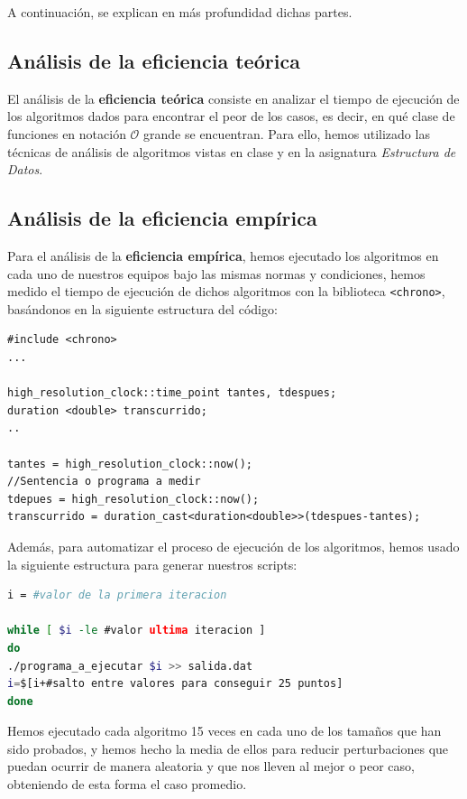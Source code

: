 \documentclass[10pt,a4paper]{article}
\begin{document}
A continuación, se explican en más profundidad dichas partes.

\subsection{Análisis de la eficiencia teórica}

El análisis de la \textbf{eficiencia teórica} consiste en analizar el tiempo de ejecución de los algoritmos dados para encontrar el peor de los casos, es decir, en qué clase de funciones en notación \(\mathcal{O}\) grande se encuentran. Para ello, hemos utilizado las técnicas de análisis de algoritmos vistas en clase y en la asignatura \textit{Estructura de Datos}.

\subsection{Análisis de la eficiencia empírica}

Para el análisis de la \textbf{eficiencia empírica}, hemos ejecutado los algoritmos en cada uno de nuestros equipos bajo las mismas normas y condiciones, hemos medido el tiempo de ejecución de dichos algoritmos con la biblioteca \texttt{<chrono>}, basándonos en la siguiente estructura del código:

\begin{lstlisting}
#include <chrono>
...

high_resolution_clock::time_point tantes, tdespues;
duration <double> transcurrido;
..

tantes = high_resolution_clock::now();
//Sentencia o programa a medir
tdepues = high_resolution_clock::now();
transcurrido = duration_cast<duration<double>>(tdespues-tantes);
\end{lstlisting}

Además, para automatizar el proceso de ejecución de los algoritmos, hemos usado la siguiente estructura para generar nuestros scripts:
\begin{lstlisting}[language=bash]
i = #valor de la primera iteracion

while [ $i -le #valor ultima iteracion ]
do
./programa_a_ejecutar $i >> salida.dat
i=$[i+#salto entre valores para conseguir 25 puntos]
done
\end{lstlisting}

Hemos ejecutado cada algoritmo 15 veces en cada uno de los tamaños que han sido probados, y hemos hecho la media de ellos para reducir perturbaciones que puedan ocurrir de manera aleatoria y que nos lleven al mejor o peor caso, obteniendo de esta forma el caso promedio. 
\end{document}
